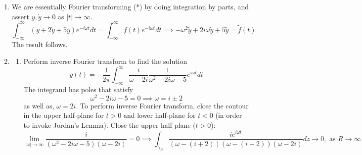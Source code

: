 \documentclass[a4paper]{article}
\begin{document}
\begin{ans}\leavevmode
\begin{enumerate}[label=(\alph*)]
\item We are essentially Fourier transforming (*) by doing integration by parts, and assert $y,\dot{y}\rightarrow 0$ as $|t|\rightarrow\infty$.
$$\int_{-\infty}^\infty(\ddot{y}+2\dot{y}+5y)e^{-i\omega t}dt=\int_{-\infty}^\infty f(t)e^{-i\omega t}dt\implies-\omega^2\tilde{y}+2i\omega\tilde{y}+5\tilde{y}=\tilde{f}(t)$$
The result follows.
\item 
\begin{enumerate}[label=(\roman*)]
\item Perform inverse Fourier transform to find the solution
$$y(t)=-\frac{1}{2\pi}\int_{-\infty}^\infty\frac{i}{\omega -2i}\frac{1}{\omega^2-2i\omega-5}e^{i\omega t}dt$$
The integrand has poles that satisfy $$\omega^2-2i\omega-5=0\implies\omega=i\pm 2$$
as well as, $\omega=2i$. To perform inverse Fourier transform, close the contour in the upper half-plane for $t>0$ and lower half-plane for $t<0$ (in order to invoke Jordan's Lemma). Close the upper half-plane ($t>0$):
$$\lim_{|\omega|\rightarrow\infty}\frac{i}{(\omega^2-2i\omega-5)(\omega-2i)}=0\implies\int_{\gamma_R}\frac{ie^{i\omega t}}{(\omega-(i+2))(\omega-(i-2))(\omega-2i)}dz\rightarrow 0,\text{ as }R\rightarrow\infty$$
\begin{center}
\end{center}
\end{enumerate}
\end{enumerate}
\end{ans}
\end{document}
